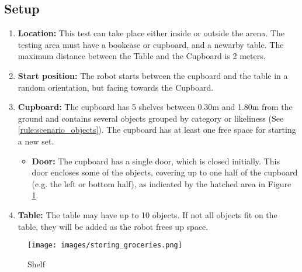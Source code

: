 %
%
\begin{minipage}{0.70\textwidth}
	\subsection{Setup}
	\begin{enumerate}
		\item \textbf{Location:} This test can take place either inside or outside the arena. The testing area must have a bookcase or cupboard, and a newarby table. The maximum distance between the Table and the Cupboard is 2 meters.
		\item \textbf{Start position:} The robot starts between the cupboard and the table in a random orientation, but facing towards the Cupboard.
		\item \textbf{Cupboard:} The cupboard has 5 shelves between 0.30m and 1.80m from the ground and contains several objects grouped by category or likeliness (See \ref{rule:scenario_objects}). The cupboard has at least one free space for starting a new set.
		\begin{itemize}
		 	\item \textbf{Door:} The cupboard has a single door, which is closed initially.
		 	This door encloses some of the objects, covering up to one half of the cupboard (e.g. the left or bottom half), as indicated by the hatched area in Figure \ref{fig:storing_groceries_shelf}.
		\end{itemize}
		\item \textbf{Table:} The table may have up to 10 objects. If not all objects fit on the table, they will be added as the robot frees up space.
	\end{enumerate}
\end{minipage}\hfill
\begin{minipage}{0.25\textwidth}
	\begin{figure}[H]
		\centering
		\texttt{[image: images/storing\_groceries.png]}%
		\vspace{-10pt}
		\caption{Shelf}
		\label{fig:storing_groceries_shelf}
	\end{figure}
\end{minipage}

%
%
